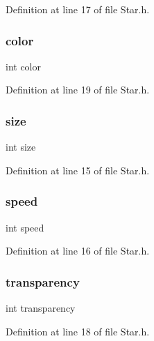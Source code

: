 Definition at line 17 of file Star.\+h.

\mbox{\label{structstars_a0fd02fb9277ffcb35a75066ffe95e8c7}} 
\subsubsection{\texorpdfstring{color}{color}}
{\footnotesize\ttfamily int color}



Definition at line 19 of file Star.\+h.

\mbox{\label{structstars_a439227feff9d7f55384e8780cfc2eb82}} 
\subsubsection{\texorpdfstring{size}{size}}
{\footnotesize\ttfamily int size}



Definition at line 15 of file Star.\+h.

\mbox{\label{structstars_a218b4f7c6cc2681a99c23a3b089d68b1}} 
\subsubsection{\texorpdfstring{speed}{speed}}
{\footnotesize\ttfamily int speed}



Definition at line 16 of file Star.\+h.

\mbox{\label{structstars_a461e984e1aa59a77334843735aec9035}} 
\subsubsection{\texorpdfstring{transparency}{transparency}}
{\footnotesize\ttfamily int transparency}



Definition at line 18 of file Star.\+h.

\mbox{\label{structstars_a6150e0515f7202e2fb518f7206ed97dc}} 
